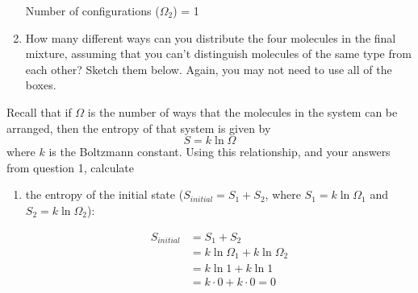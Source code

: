 \begin{activity}
\begin{ctqs}
\begin{enumerate}
\begin{solution}
{						\vspace{0.1in}
						\centerline{Number of configurations ($\Omega_2$) = 1}
					}
				\end{solution}
			
			\item How many different ways can you distribute the four molecules in the final mixture, assuming that you can't distinguish molecules of the same type from each other?  Sketch them below.  Again, you may not need to use all of the boxes.
			
				\begin{solution}
				\end{solution}
		\end{enumerate}
		
	\question Recall that if $\Omega$ is the number of ways that the molecules in the system can be arranged, then the entropy of that system is given by
		\begin{equation*}
			S = k \ln \Omega
		\end{equation*} 
		where $k$ is the Boltzmann constant.  Using this relationship, and your answers from question 1, calculate
			
		\begin{enumerate}
			\item the entropy of the initial state ($S_{initial} = S_1 + S_2$, where $S_1 = k\ln \Omega_1$ and $S_2 = k \ln \Omega_2$):
			
				\begin{solution}[1in]
					\begin{align*}
						S_{initial} &= S_1 + S_2 \\
							&= k\ln\Omega_1 + k\ln\Omega_2\\
							&= k \ln 1 + k \ln 1 \\
							&= k\cdot 0 + k\cdot 0 = 0
					\end{align*}
				\end{solution}
				

\end{enumerate}
\end{ctqs}
\end{activity}
